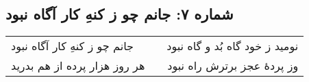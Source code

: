 \begin{center}
\section*{شماره ۷: جانم چو ز کنهِ کار آگاه نبود}
\label{sec:007}
\begin{longtable}{l p{0.5cm} r}
جانم چو ز کنهِ کار آگاه نبود
&&
نومید ز خود گاه بُد و گاه نبود
\\
هر روز هزار پرده از هم بدرید
&&
وز پردهٔ عجز برترش راه نبود
\\
\end{longtable}
\end{center}
